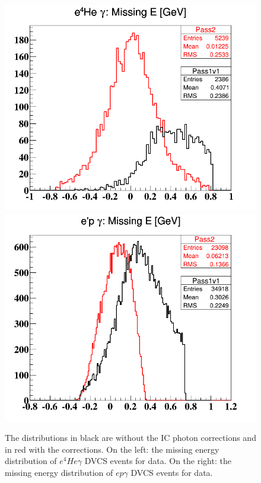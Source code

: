 \begin{figure}[tp]
\centering
\includegraphics[scale=0.30]{fig_simulation/Coh_e4Hegamma_E_Mis.png}
\includegraphics[scale=0.30]{fig_simulation/InCoh_epgamma_E_Mis.png}
\caption{The distributions in black are without the IC photon corrections and in red with the corrections. On the left: the missing energy distribution of $e^{4}He\gamma$ DVCS events for data. On the right: the missing energy distribution of $ep\gamma$ DVCS events for data.} 
\label{fig:ic_exp_correction_dvcs_comp}
\end{figure}


